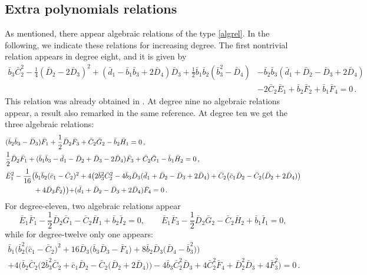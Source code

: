 \documentclass[10pt]{amsart}
\theoremstyle{definition}
\theoremstyle{corollary}
\theoremstyle{remark}
\theoremstyle{conclusion}
\begin{document}
\subsection{Extra polynomials relations} 
\label{4.12}

As mentioned, there appear algebraic relations of the type \eqref{algrel}. 
 In the following, we indicate these relations for increasing degree. The first nontrivial relation appears in degree eight, and it is given by
\begin{align}
		\bar{b}_3\bar{C}_2^2-\frac{1}{4}(\bar{D}_2-2 \bar{D}_3)^2+(\bar{d}_1-\bar{b}_1 \bar{b}_3+2 \bar{D}_4)\bar{D}_3+\frac{1}{2}\bar{b}_1 \bar{b}_2(\bar{b}_3^2-\bar{D}_4)&-\bar{b}_2 \bar{b}_3(\bar{d}_1+\bar{D}_2-\bar{D}_3+2 \bar{D}_4) \nonumber\\
		&-2 \bar{C}_2 \bar{E}_1+\bar{b}_2 \bar{F}_2+\bar{b}_1 \bar{F}_4=0 \, . \label{alge8}
\end{align}
 This relation was already obtained in \cite{nuclear}. At degree nine no algebraic relations appear, a result also remarked in the same reference. At degree ten we get the three algebraic relations:
	\begin{align}
		&(\bar{b}_2 \bar{b}_3-\bar{D}_3)\bar{F}_1+\frac{1}{2}\bar{D}_2 \bar{F}_3+\bar{C}_2 \bar{G}_2-\bar{b}_2 \bar{H}_1=0 \, ,\nonumber\\ 
		&\frac{1}{2}\bar{D}_2 \bar{F}_1+(\bar{b}_1 \bar{b}_3-\bar{d}_1-\bar{D}_2+\bar{D}_3-2 \bar{D}_4)\bar{F}_3+\bar{C}_2 \bar{G}_1-\bar{b}_1 \bar{H}_2=0 \, ,\\
		&\bar{E}_1^2-\frac{1}{16}\bigl(\bar{b}_1 \bar{b}_2(\bar{c}_1-\bar{C}_2)^2+4\bigl(2 \bar{b}_3^2 \bar{C}_2^2-4 \bar{b}_3 \bar{D}_3(\bar{d}_1+\bar{D}_2-\bar{D}_3+2\bar{D}_4)+\bar{C}_2\bigl(\bar{c}_1 \bar{D}_2-\bar{C}_2(\bar{D}_2+2\bar{D}_4)\bigl) \nonumber\\
		&\hskip 1.4cm+4 \bar{D}_3 \bar{F}_2\bigl)\bigl)+(\bar{d}_1+\bar{D}_2-\bar{D}_3+2\bar{D}_4)\bar{F}_4=0 \, .\nonumber
\end{align}
For degree-eleven, two algebraic relations appear
\begin{equation}
\bar{E}_1 \bar{F}_1-\frac{1}{2}\bar{D}_2 \bar{G}_1-\bar{C}_2 \bar{H}_1+\bar{b}_2 \bar{I}_2=0,\qquad 
\bar{E}_1 \bar{F}_3-\frac{1}{2}\bar{D}_2 \bar{G}_2-\bar{C}_2 \bar{H}_2+\bar{b}_1 \bar{I}_1=0,
\end{equation}
 while for degree-twelve only one appears:
\begin{align}
\bar{b}_1 \bigl(\bar{b}_2^2 \bigl(\bar{c}_1-\bar{C}_2\bigl)^2+16 \bar{D}_3 \bigl(\bar{b}_3 \bar{D}_3-\bar{F}_4\bigl)+8 \bar{b}_2 \bar{D}_3 \bigl(\bar{D}_4-\bar{b}_3^2\bigl)\bigl)\nonumber\\+4 \bigl(\bar{b}_2 \bar{C}_2 \bigl(2 \bar{b}_3^2 \bar{C}_2+\bar{c}_1 \bar{D}_2-\bar{C}_2 \bigl(\bar{D}_2+2 \bar{D}_4\bigl)\bigl)-4 \bar{b}_3 \bar{C}_2^2 \bar{D}_3+4 \bar{C}_2^2 \bar{F}_4+\bar{D}_2^2 \bar{D}_3+4 \bar{F}_3^2\bigl)=0 \, .
\end{align}
\end{document}
